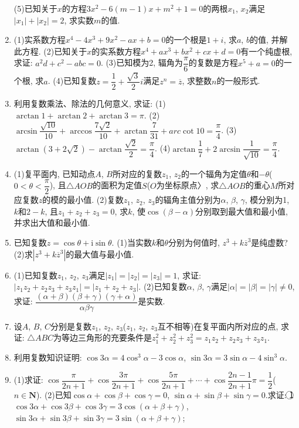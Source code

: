 \documentclass[10pt,a4paper]{article}
\begin{document}
\begin{enumerate}[1.]
(5)已知关于$x$的方程$3x^2-6(m-1)x+m^2+1=0$的两根$x_1$, $x_2$满足$|x_1|+|x_2|=2$, 求实数$m$的值.
\item (1)实系数方程$x^4-4x^3+9x^2-ax+b=0$的一个根是$1+i$, 求$a$, $b$的值, 并解此方程.
(2)已知关于$x$的实系数方程$x^4+ax^3+bx^2+cx+d=0$有一个纯虚根, 求证: $a^2d+c^2-abc=0$.
(3)已知模为2, 辐角为$\dfrac{\pi }6$的复数是方程$x^5+a=0$的一个根, 求$a$.
(4)已知复数$z=\dfrac 12+\dfrac{\sqrt 3}2i$满足$z^n=\overline z$, 求整数$n$的一般形式.
\item 利用复数乘法、除法的几何意义, 求证:
(1)$\arctan 1+\arctan 2+\arctan 3=\pi$.
(2)$\arcsin \dfrac{\sqrt {10}}{10}+\arccos \dfrac{7\sqrt 2}{10}+\arctan \dfrac 7{31}+arc\cot 10=\dfrac{\pi }4$.
(3)$\arctan (3+2\sqrt 2)-\arctan \dfrac{\sqrt 2}2=\dfrac{\pi }4$.
(4)$\arctan \dfrac 17+2\arcsin \dfrac 1{\sqrt {10}}=\dfrac{\pi }4$.
\item (1)复平面内, 已知动点$A$, $B$所对应的复数$z_1$, $z_2$的一个辐角为定值$\theta$和$-\theta$($0<\theta <\dfrac{\pi }2$), 且$\triangle AOB$的面积为定值$S$($O$为坐标原点〉, 求$\triangle AOB$的重心$M$所对应复数$z$的模的最小值.
(2)复数$z_1$, $z_2$, $z_3$的辐角主值分别为$\alpha$, $\beta$, $\gamma$, 模分别为1, $k$和$2-k$, 且$z_1+z_2+z_3=0$, 求$k$, 使$\cos (\beta -\alpha)$分别取到最大值和最小值, 并求出大值和最小值.
\item 已知复数$z=\cos \theta +\mathrm{i}\sin \theta$.
(1)当实数$k$和$\theta$分别为何值时, $z^3+k\overline z^3$是纯虚数?
(2)求$|z^3+k\overline z^3|$的最大值与最小值.
\item (1)已知复数$z_1$, $z_2$, $z_3$满足$|z_1|=|z_2|=|z_3|=1$, 求证: $|z_1z_2+z_2z_3+z_3z_1|=|z_1+z_2+z_3|$.
(2)已知复数$\alpha$, $\beta$, $\gamma$满足$|\alpha|=|\beta|=|\gamma|\ne 0$, 求证: $\dfrac{(\alpha +\beta)(\beta +\gamma)(\gamma +\alpha)}{\alpha \beta \gamma }$是实数.
\item 设$A$, $B$, $C$分别是复数$z_1$, $z_2$, $z_3$($z_1$, $z_2$, $z_3$互不相等)在复平面内所对应的点, 求证: $\triangle ABC$为等边三角形的充要条件是$z_1^2+z_2^2+z_3^2=z_1z_2+z_2z_3+z_3z_1$.
\item 利用复数知识证明: $\cos 3\alpha =4\cos ^3\alpha -3\cos \alpha$, $\sin 3\alpha =3\sin \alpha -4\sin ^3\alpha$.
\item (1)求证: $\cos \dfrac{\pi }{2n+1}+\cos \dfrac{3\pi }{2n+1}+\cos \dfrac{5\pi }{2n+1}+\cdots +\cos \dfrac{2n-1}{2n+1}\pi =\dfrac 12$($n\in \mathbf{N}$).
(2)已知$\cos \alpha +\cos \beta +\cos \gamma =0$, $\sin \alpha +\sin \beta +\sin \gamma =0$.求证:
\textcircled{1} $\cos 3\alpha +\cos 3\beta +\cos 3\gamma =3\cos (\alpha +\beta +\gamma)$, $\sin 3\alpha +\sin 3\beta +\sin 3\gamma =3\sin (\alpha +\beta +\gamma)$;

\end{enumerate}
\end{document}
